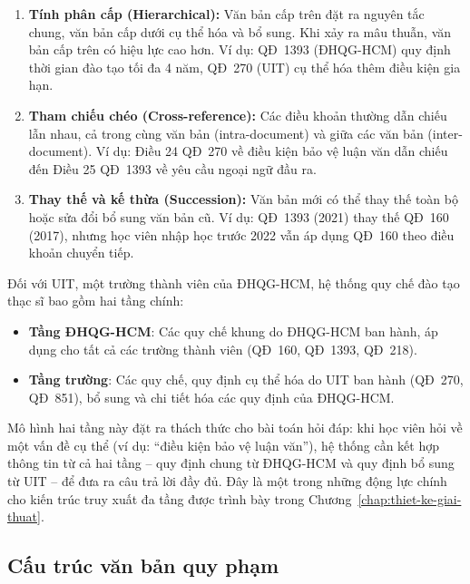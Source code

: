 \begin{enumerate}
  \item \textbf{Tính phân cấp (Hierarchical):} Văn bản cấp trên đặt ra nguyên tắc
        chung, văn bản cấp dưới cụ thể hóa và bổ sung. Khi xảy ra mâu thuẫn, văn
        bản cấp trên có hiệu lực cao hơn. Ví dụ: QĐ~1393 (ĐHQG-HCM) quy định thời
        gian đào tạo tối đa 4 năm, QĐ~270 (UIT) cụ thể hóa thêm điều kiện gia hạn.

  \item \textbf{Tham chiếu chéo (Cross-reference):} Các điều khoản thường dẫn chiếu
        lẫn nhau, cả trong cùng văn bản (intra-document) và giữa các văn bản
        (inter-document). Ví dụ: Điều 24 QĐ~270 về điều kiện bảo vệ luận văn dẫn
        chiếu đến Điều 25 QĐ~1393 về yêu cầu ngoại ngữ đầu ra.

  \item \textbf{Thay thế và kế thừa (Succession):} Văn bản mới có thể thay thế toàn
        bộ hoặc sửa đổi bổ sung văn bản cũ. Ví dụ: QĐ~1393 (2021) thay thế QĐ~160
        (2017), nhưng học viên nhập học trước 2022 vẫn áp dụng QĐ~160 theo điều khoản
        chuyển tiếp.
\end{enumerate}

Đối với UIT, một trường thành viên của ĐHQG-HCM, hệ thống quy chế đào tạo thạc sĩ
bao gồm hai tầng chính:
\begin{itemize}
    \item \textbf{Tầng ĐHQG-HCM}: Các quy chế khung do ĐHQG-HCM ban hành, áp dụng
          cho tất cả các trường thành viên (QĐ~160, QĐ~1393, QĐ~218).
    \item \textbf{Tầng trường}: Các quy chế, quy định cụ thể hóa do UIT ban hành
          (QĐ~270, QĐ~851), bổ sung và chi tiết hóa các quy định của ĐHQG-HCM.
\end{itemize}

Mô hình hai tầng này đặt ra thách thức cho bài toán hỏi đáp: khi học viên hỏi về
một vấn đề cụ thể (ví dụ: ``điều kiện bảo vệ luận văn''), hệ thống cần kết hợp
thông tin từ cả hai tầng -- quy định chung từ ĐHQG-HCM và quy định bổ sung từ UIT
-- để đưa ra câu trả lời đầy đủ. Đây là một trong những động lực chính cho kiến
trúc truy xuất đa tầng được trình bày trong Chương~\ref{chap:thiet-ke-giai-thuat}.

\subsection{Cấu trúc văn bản quy phạm}
\label{subsec:cautruc_vanban}

